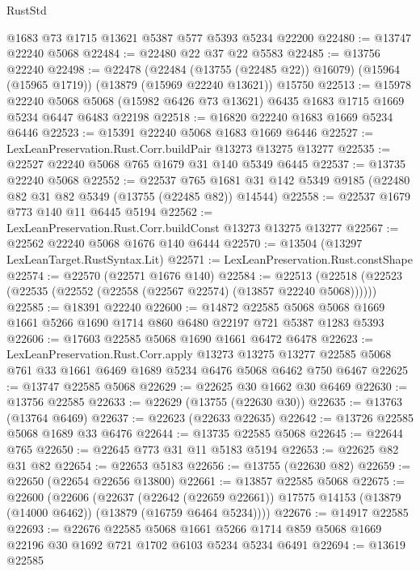 \begin{lexlean}{RustStd}
\begin{coremodule}
    @1683
    @73
    @1715
    @13621
    @5387
    @577
    @5393
    @5234
    @22200
@22480 := @13747 @22240 @5068
@22484 := @22480 @22 @37 @22 @5583
@22485 := @13756 @22240
@22498 := @22478
    (@22484 (@13755 (@22485 @22)) @16079)
    (@15964 (@15965 @1719))
    (@13879 (@15969 @22240 @13621))
    @15750
@22513 := @15978
    @22240
    @5068
    @5068
    (@15982 @6426 @73 @13621)
    @6435
    @1683
    @1715
    @1669
    @5234
    @6447
    @6483
    @22198
@22518 := @16820 @22240 @1683 @1669 @5234 @6446
@22523 := @15391 @22240 @5068 @1683 @1669 @6446
@22527 := LexLeanPreservation.Rust.Corr.buildPair @13273 @13275 @13277
@22535 := @22527 @22240 @5068 @765 @1679 @31 @140 @5349 @6445
@22537 := @13735 @22240 @5068
@22552 := @22537
    @765
    @1681
    @31
    @142
    @5349
    @9185
    (@22480 @82 @31 @82 @5349 (@13755 (@22485 @82)) @14544)
@22558 := @22537 @1679 @773 @140 @11 @6445 @5194
@22562 := LexLeanPreservation.Rust.Corr.buildConst @13273 @13275 @13277
@22567 := @22562 @22240 @5068 @1676 @140 @6444
@22570 := @13504 (@13297 LexLeanTarget.RustSyntax.Lit)
@22571 := LexLeanPreservation.Rust.constShape
@22574 := @22570 (@22571 @1676 @140)
@22584 := @22513 (@22518 (@22523 (@22535 (@22552 (@22558 (@22567 @22574) (@13857 @22240 @5068))))))
@22585 := @18391 @22240
@22600 := @14872
    @22585
    @5068
    @5068
    @1669
    @1661
    @5266
    @1690
    @1714
    @860
    @6480
    @22197
    @721
    @5387
    @1283
    @5393
@22606 := @17603 @22585 @5068 @1690 @1661 @6472 @6478
@22623 := LexLeanPreservation.Rust.Corr.apply
    @13273
    @13275
    @13277
    @22585
    @5068
    @761
    @33
    @1661
    @6469
    @1689
    @5234
    @6476
    @5068
    @6462
    @750
    @6467
@22625 := @13747 @22585 @5068
@22629 := @22625 @30 @1662 @30 @6469
@22630 := @13756 @22585
@22633 := @22629 (@13755 (@22630 @30))
@22635 := @13763 (@13764 @6469)
@22637 := @22623 (@22633 @22635)
@22642 := @13726 @22585 @5068 @1689 @33 @6476
@22644 := @13735 @22585 @5068
@22645 := @22644 @765
@22650 := @22645 @773 @31 @11 @5183 @5194
@22653 := @22625 @82 @31 @82
@22654 := @22653 @5183
@22656 := @13755 (@22630 @82)
@22659 := @22650 (@22654 @22656 @13800)
@22661 := @13857 @22585 @5068
@22675 := @22600
    (@22606
      (@22637
        (@22642 (@22659 @22661))
        @17575
        @14153
        (@13879 (@14000 @6462))
        (@13879 (@16759 @6464 @5234))))
@22676 := @14917 @22585
@22693 := @22676
    @22585
    @5068
    @1661
    @5266
    @1714
    @859
    @5068
    @1669
    @22196
    @30
    @1692
    @721
    @1702
    @6103
    @5234
    @5234
    @6491
@22694 := @13619 @22585

\end{coremodule}
\end{lexlean}
